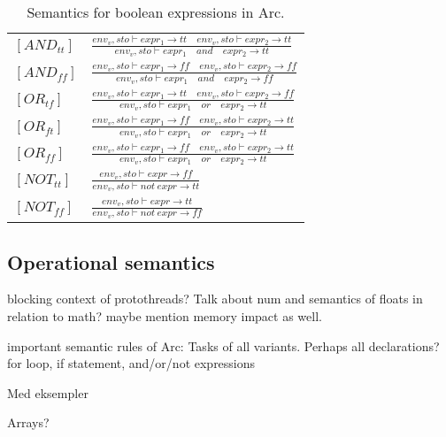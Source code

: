 \begin{table}[htb!]
    \centering
    \begin{tabular}{ll}
        \toprule
        $[AND_{tt}]$ & $\frac
            {env_v, sto \vdash expr_1 \to tt \quad env_v, sto \vdash expr_2 \to tt}
            {env_v, sto \vdash expr_1 \quad and \quad expr_2 \to tt}$ \\ [12pt]
        $[AND_{ff}]$ & $\frac
            {env_v, sto \vdash expr_1 \to ff \quad env_v, sto \vdash expr_2 \to ff}
            {env_v, sto \vdash expr_1 \quad and \quad expr_2 \to ff}$ \\ [12pt]
        $[OR_{tf}]$  & $\frac
            {env_v, sto \vdash expr_1 \to tt \quad env_v, sto \vdash expr_2 \to ff}
            {env_v, sto \vdash expr_1 \quad or \quad expr_2 \to tt}$  \\ [12pt]
        $[OR_{ft}]$  & $\frac
            {env_v, sto \vdash expr_1 \to ff \quad env_v, sto \vdash expr_2 \to tt}
            {env_v, sto \vdash expr_1 \quad or \quad expr_2 \to tt}$  \\ [12pt]
        $[OR_{ff}]$  & $\frac
            {env_v, sto \vdash expr_1 \to ff \quad env_v, sto \vdash expr_2 \to tt}
            {env_v, sto \vdash expr_1 \quad or \quad expr_2 \to tt}$  \\ [12pt]
        $[NOT_{tt}]$ & $\frac
            {env_v, sto \vdash expr \to ff}
            {env_v, sto \vdash not \ expr \to tt}$                    \\ [12pt]
        $[NOT_{ff}]$ & $\frac
            {env_v, sto \vdash expr \to tt}
            {env_v, sto \vdash not \ expr \to ff}$                    \\
        \bottomrule
    \end{tabular}
    \caption{Semantics for boolean expressions in Arc.}
    \label{tab:booleansemantics}
\end{table}





\subsection{Operational semantics}\label{subsec:operationalsemantics}
blocking context of protothreads?
Talk about num and semantics of floats in relation to math? maybe mention memory impact as well.

important semantic rules of Arc:
Tasks of all variants. Perhaps all declarations?
for loop, if statement, and/or/not expressions

Med eksempler

Arrays?
